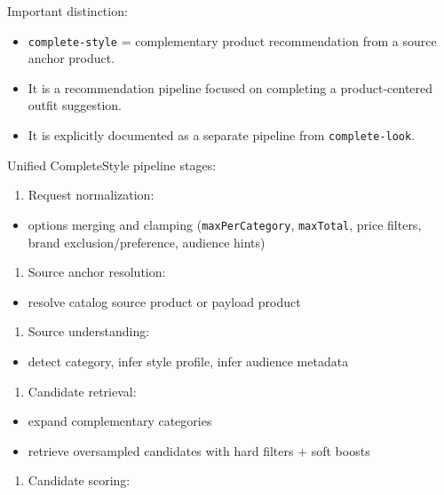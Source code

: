 \documentclass[12pt,a4paper]{report}
\begin{document}
Important distinction:

\begin{itemize}
\item \texttt{complete-style} = complementary product recommendation from a source anchor product.
\item It is a recommendation pipeline focused on completing a product-centered outfit suggestion.
\item It is explicitly documented as a separate pipeline from \texttt{complete-look}.
\end{itemize}

Unified CompleteStyle pipeline stages:

\begin{enumerate}
\item Request normalization:
\end{enumerate}
\begin{itemize}
\item options merging and clamping (\texttt{maxPerCategory}, \texttt{maxTotal}, price filters, brand exclusion/preference, audience hints)
\end{itemize}
\begin{enumerate}
\item Source anchor resolution:
\end{enumerate}
\begin{itemize}
\item resolve catalog source product or payload product
\end{itemize}
\begin{enumerate}
\item Source understanding:
\end{enumerate}
\begin{itemize}
\item detect category, infer style profile, infer audience metadata
\end{itemize}
\begin{enumerate}
\item Candidate retrieval:
\end{enumerate}
\begin{itemize}
\item expand complementary categories
\item retrieve oversampled candidates with hard filters + soft boosts
\end{itemize}
\begin{enumerate}
\item Candidate scoring:
\end{enumerate}
\end{document}
